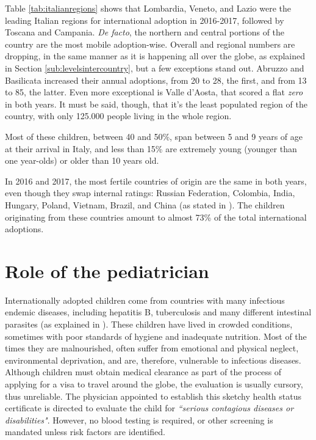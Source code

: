 Table \ref{tab:italianregions} shows that Lombardia, Veneto, and Lazio were the leading Italian regions for international adoption in 2016-2017, followed by Toscana and Campania. \textit{De facto}, the northern and central portions of the country are the most mobile adoption-wise.  Overall and regional numbers are dropping, in the same manner as it is happening all over the globe, as explained in Section \ref{sub:levelsintercountry}, but a few exceptions stand out. Abruzzo and Basilicata increased their annual adoptions, from 20 to 28, the first, and from 13 to 85, the latter. Even more exceptional is Valle d'Aosta, that scored a flat \textit{zero} in both years. It must be said, though, that it's the least populated region of the country, with only 125.000 people living in the whole region.

Most of these children, between 40 and 50\%, span between 5 and 9 years of age at their arrival in Italy, and less than 15\% are extremely young (younger than one year-olds) or older than 10 years old. 

In 2016 and 2017, the most fertile countries of origin are the same in both years, even though they swap internal ratings: Russian Federation, Colombia, India, Hungary, Poland, Vietnam, Brazil, and China (as stated in \cite{cai2016}). The children originating from these countries amount to almost 73\% of the total international adoptions.

\section{Role of the pediatrician}\label{sec:roleofpediatrician}
Internationally adopted children come from countries with many infectious endemic diseases, including hepatitis B, tuberculosis and many different intestinal parasites (as explained in \cite{caringfor}). These children have lived in crowded conditions, sometimes with poor standards of hygiene and inadequate nutrition. Most of the times they are malnourished, often suffer from emotional and physical neglect, environmental deprivation, and are, therefore, vulnerable to infectious diseases. Although children must obtain medical clearance as part of the process of applying for a visa to travel around the globe, the evaluation is usually cursory, thus unreliable. The physician appointed to establish this sketchy health status certificate is directed to evaluate the child for \textit{``serious contagious diseases or disabilities"}. However, no blood testing is required, or other screening is mandated unless risk factors are identified.

